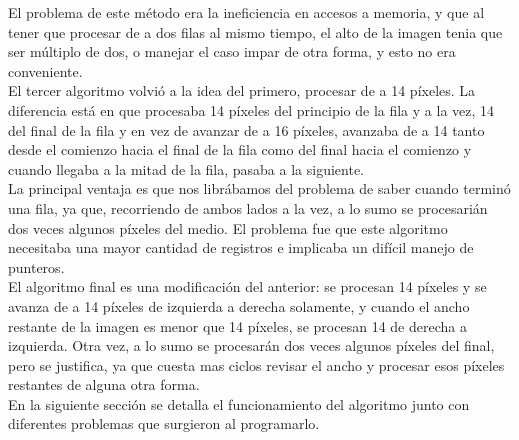 El problema de este m\'etodo era la ineficiencia en accesos a memoria, y que al tener que procesar de a dos filas al mismo tiempo, el alto de la imagen tenia que ser m\'ultiplo de dos, o manejar el caso impar de otra forma, y esto no era conveniente. \\


El tercer algoritmo volvi\'o a la idea del primero, procesar de a 14 p\'ixeles. La diferencia est\'a en que procesaba 14 p\'ixeles del principio de la fila y a la vez, 14 del final de la fila y en vez de avanzar de a 16 p\'ixeles, avanzaba de a 14 tanto desde el comienzo hacia el final de la fila como del final hacia el comienzo y cuando llegaba a la mitad de la fila, pasaba a la siguiente. \\

La principal ventaja es que nos libr\'abamos del problema de saber cuando termin\'o una fila, ya que, recorriendo de ambos lados a la vez, a lo sumo se procesari\'an dos veces algunos p\'ixeles del medio. El problema fue que este algoritmo necesitaba una mayor cantidad de registros e implicaba un dif\'icil manejo de punteros. \\
	
El algoritmo final es una modificaci\'on del anterior: se procesan 14 p\'ixeles y se avanza de a 14 p\'ixeles de izquierda a derecha solamente, y cuando el ancho restante de la imagen es menor que 14 p\'ixeles, se procesan 14 de derecha a izquierda. Otra vez, a lo sumo se procesar\'an dos veces algunos p\'ixeles del final, pero se justifica, ya que cuesta mas ciclos revisar el ancho y procesar esos p\'ixeles restantes de alguna otra forma. \\

En la siguiente secci\'on se detalla el funcionamiento del algoritmo junto con diferentes problemas que surgieron al programarlo. \\

\pagebreak
